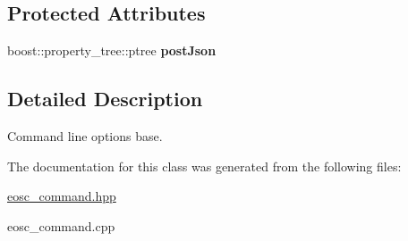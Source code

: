 \subsection*{Protected Attributes}
\begin{DoxyCompactItemize}
\item 
\mbox{\label{classtokenika_1_1eosc_1_1_command_options_a626e842c89d8332090886bc53fbad616}} 
boost\+::property\+\_\+tree\+::ptree {\bfseries post\+Json}
\end{DoxyCompactItemize}


\subsection{Detailed Description}
Command line options base. 

The documentation for this class was generated from the following files\+:\begin{DoxyCompactItemize}
\item 
\hyperlink{eosc__command_8hpp}{eosc\+\_\+command.\+hpp}\item 
eosc\+\_\+command.\+cpp\end{DoxyCompactItemize}
